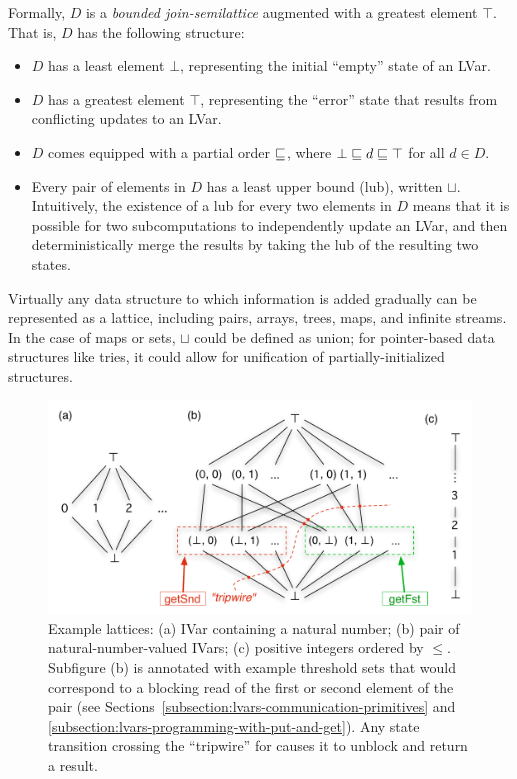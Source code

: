 Formally, $D$ is a \emph{bounded join-semilattice} augmented with a
greatest element $\top$.  That is, $D$ has the following structure:
\begin{itemize}
\item $D$ has a least element $\bot$, representing the initial
  ``empty'' state of an LVar.
\item $D$ has a greatest element $\top$, representing the ``error''
  state that results from conflicting updates to an LVar.
\item $D$ comes equipped with a partial order $\sqsubseteq$, where $\bot
  \sqsubseteq d \sqsubseteq \top$ for all $d \in D$.
\item Every pair of elements in $D$ has a least upper bound (lub),
  written $\sqcup$.  Intuitively, the existence of a lub for every two
  elements in $D$ means that it is possible for two subcomputations to
  independently update an LVar, and then deterministically merge the
  results by taking the lub of the resulting two states.
\end{itemize}

Virtually any data structure to which information is added gradually
can be represented as a lattice, including pairs, arrays, trees, maps,
and infinite streams.  In the case of maps or sets, $\sqcup$ could be
defined as union; for pointer-based data structures like tries, it
could allow for unification of partially-initialized structures.

\begin{figure}
\includegraphics[width=5in]{chapter2/figures/ExampleLattices2.pdf} 
  \caption{Example lattices: (a) IVar containing a natural number; (b)
    pair of natural-number-valued IVars; (c) positive integers ordered
    by $\leq$.  Subfigure (b) is annotated with example threshold sets
    that would correspond to a blocking read of the first or second
    element of the pair (see
    Sections~\ref{subsection:lvars-communication-primitives} and
    \ref{subsection:lvars-programming-with-put-and-get}).  Any state
    transition crossing the ``tripwire'' for  causes
    it to unblock and return a result.}
    \label{f:lvars-example-lattices}
\end{figure}

